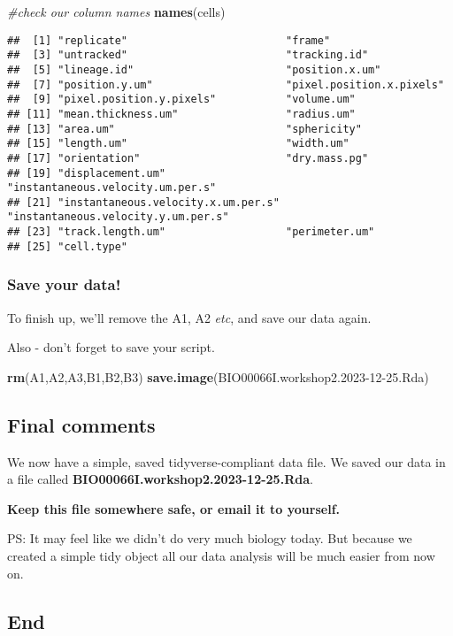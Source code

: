 \documentclass[
]{article}
\newenvironment{Shaded}{\begin{snugshade}}{\end{snugshade}}
\newcommand{\CommentTok}[1]{\textcolor[rgb]{0.56,0.35,0.01}{\textit{#1}}}
\newcommand{\FunctionTok}[1]{\textcolor[rgb]{0.13,0.29,0.53}{\textbf{#1}}}
\newcommand{\NormalTok}[1]{#1}
\newcommand{\StringTok}[1]{\textcolor[rgb]{0.31,0.60,0.02}{#1}}
\begin{document}
\begin{Shaded}
\begin{Highlighting}[]
\CommentTok{\#check our column names}
\FunctionTok{names}\NormalTok{(cells)}
\end{Highlighting}
\end{Shaded}

\begin{verbatim}
##  [1] "replicate"                         "frame"                            
##  [3] "untracked"                         "tracking.id"                      
##  [5] "lineage.id"                        "position.x.um"                    
##  [7] "position.y.um"                     "pixel.position.x.pixels"          
##  [9] "pixel.position.y.pixels"           "volume.um"                        
## [11] "mean.thickness.um"                 "radius.um"                        
## [13] "area.um"                           "sphericity"                       
## [15] "length.um"                         "width.um"                         
## [17] "orientation"                       "dry.mass.pg"                      
## [19] "displacement.um"                   "instantaneous.velocity.um.per.s"  
## [21] "instantaneous.velocity.x.um.per.s" "instantaneous.velocity.y.um.per.s"
## [23] "track.length.um"                   "perimeter.um"                     
## [25] "cell.type"
\end{verbatim}

\hypertarget{save-your-data}{%
\subsubsection{Save your data!}\label{save-your-data}}

To finish up, we'll remove the A1, A2 \emph{etc}, and save our data
again.

Also - don't forget to save your script.

\begin{Shaded}
\begin{Highlighting}[]
\FunctionTok{rm}\NormalTok{(A1,A2,A3,B1,B2,B3)}
\FunctionTok{save.image}\NormalTok{(}\StringTok{\textquotesingle{}BIO00066I.workshop2.2023{-}12{-}25.Rda\textquotesingle{}}\NormalTok{)}
\end{Highlighting}
\end{Shaded}

\hypertarget{final-comments}{%
\subsection{Final comments}\label{final-comments}}

We now have a simple, saved tidyverse-compliant data file. We saved our
data in a file called \textbf{BIO00066I.workshop2.2023-12-25.Rda}.

\textbf{Keep this file somewhere safe, or email it to yourself.}

PS: It may feel like we didn't do very much biology today. But because
we created a simple tidy object all our data analysis will be much
easier from now on.

\hypertarget{end}{%
\subsection{End}\label{end}}
\end{document}
